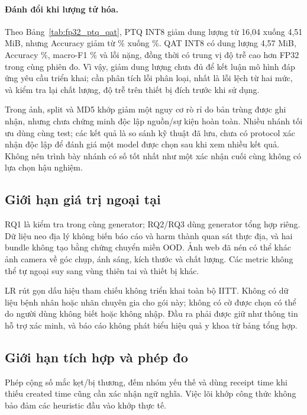 \paragraph{Đánh đổi khi lượng tử hóa.}
Theo Bảng~\ref{tab:fp32_ptq_qat}, PTQ INT8 giảm dung lượng từ 16,04 xuống 4,51 MiB, nhưng Accuracy giảm từ \NewImageAccuracy\% xuống \PTQAccuracy\%. QAT INT8 có dung lượng 4,57 MiB, Accuracy \QATAccuracy\%, macro-F1 \QATMacroFOne\% và \QATCriticalCount{} lỗi nặng, đồng thời có trung vị độ trễ cao hơn FP32 trong cùng phiên đo. Vì vậy, giảm dung lượng chưa đủ để kết luận mô hình đáp ứng yêu cầu triển khai; cần phân tích lỗi phân loại, nhất là lỗi lệch từ hai mức, và kiểm tra lại chất lượng, độ trễ trên thiết bị đích trước khi sử dụng.

Trong ảnh, split và MD5 khớp giảm một nguy cơ rò rỉ do bản trùng được ghi nhận, nhưng chưa chứng minh độc lập nguồn/sự kiện hoàn toàn. Nhiều nhánh tối ưu dùng cùng test; các kết quả là so sánh kỹ thuật đã lưu, chưa có protocol xác nhận độc lập để đánh giá một model được chọn sau khi xem nhiều kết quả. Không nên trình bày nhánh có số tốt nhất như một xác nhận cuối cùng không có lựa chọn hậu nghiệm.

\subsection{Giới hạn giá trị ngoại tại}
RQ1 là kiểm tra trong cùng generator; RQ2/RQ3 dùng generator tổng hợp riêng. Dữ liệu neo địa lý không biến báo cáo và harm thành quan sát thực địa, và hai bundle không tạo bằng chứng chuyển miền OOD. Ảnh web đã nén có thể khác ảnh camera về góc chụp, ánh sáng, kích thước và chất lượng. Các metric không thể tự ngoại suy sang vùng thiên tai và thiết bị khác.

LR rút gọn dấu hiệu tham chiếu không triển khai toàn bộ IITT. Không có dữ liệu bệnh nhân hoặc nhãn chuyên gia cho gói này; không có cờ được chọn có thể do người dùng không biết hoặc không nhập. Đầu ra phải được giữ như thông tin hỗ trợ xác minh, và báo cáo không phát biểu hiệu quả y khoa từ bảng tổng hợp.

\subsection{Giới hạn tích hợp và phép đo}
Phép cộng số mắc kẹt/bị thương, đếm nhóm yếu thế và dùng receipt time khi thiếu created time cũng cần xác nhận ngữ nghĩa. Việc lõi khớp công thức không bảo đảm các heuristic đầu vào khớp thực tế.

